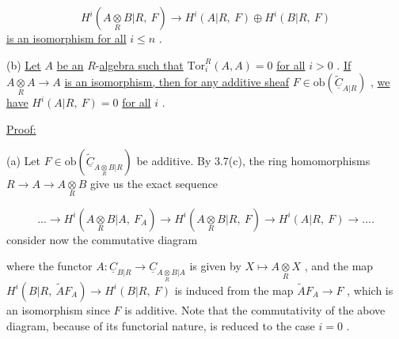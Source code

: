 \begin{equation*}
H^{i}(A\underset{R}{\otimes}B|R,\ F) \rightarrow H^{i}(A|R,\ F) \oplus H^{i}(B|R,\ F)
\end{equation*}
\underline{is an isomorphism for all}  $i \leq n$  .

(b)  \underline{Let}  $A$  \underline{be an} $R$-\underline{algebra such that}  $\mathrm{Tor}^{R}_{i}(A, A) = 0$  \underline{for all}  $i > 0$  . \underline{If}  $A\underset{R}{\otimes}A \rightarrow A$  \underline{is an isomorphism, then for any additive sheaf}  $F \in \mathrm{ob}(\widetilde{\underline{C}}_{A|R})$  , \underline{we have}  $H^{i}(A|R,\ F) = 0$  \underline{for all}  $i$  .


\underline{Proof:}

(a)  Let  $F \in \mathrm{ob}(\widetilde{\underline{C}}_{A\underset{R}{\otimes}B|R})$  be additive. By 3.7(c), the ring homomorphisms $R \rightarrow A \rightarrow A\underset{R}{\otimes}B$  give us the exact sequence

\begin{equation}\tag{*}
... \rightarrow H^{i}(A\underset{R}{\otimes}B|A,\ F_{A}) \rightarrow H^{i}(A\underset{R}{\otimes}B|R,\ F) \rightarrow H^{i}(A|R,\ F) \rightarrow ....
\end{equation}
consider now the commutative diagram

\begin{center}
\end{center}
where the functor  $A : \underline{C}_{B|R} \rightarrow \underline{C}_{A\underset{R}{\otimes}B|A}$  is given by  $X \longmapsto A\underset{R}{\otimes}X$  , and the map $H^{i}(B|R,\ \widetilde{A}F_{A}) \rightarrow H^{i}(B|R,\ F)$  is induced from the map  $\widetilde{A}F_{A} \rightarrow F$  , which is an isomorphism since  $F$  is additive.  Note that the commutativity of the above diagram, because of its functorial nature, is reduced to the case  $i = 0$  .

